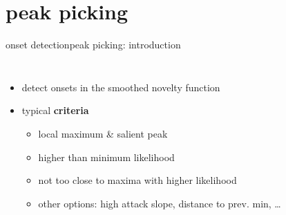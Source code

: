     \section{peak picking}
        \begin{frame}{onset detection}{peak picking: introduction}
            \vspace{-4mm}
            \begin{columns}
            \begin{itemize}
                \item	detect onsets in the smoothed novelty function
                \item<2->	typical \textbf{criteria}
                    \begin{itemize}
                        \item<2->	local maximum \& salient peak
                        \item<2->	higher than minimum likelihood
                        \item<2->	not too close to maxima with higher likelihood
                        \item<2->	other options: high attack slope, distance to prev. min, \ldots
                    \end{itemize}
            \end{itemize}
                    \vspace{-1mm}
            \end{columns}
        \end{frame}
